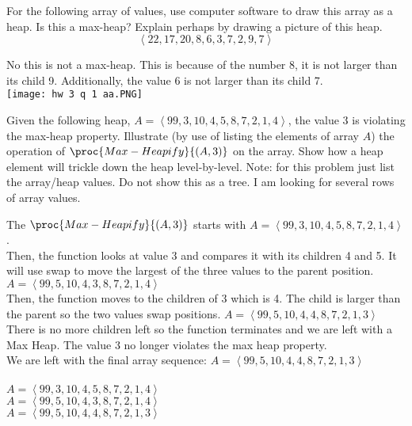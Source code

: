 \documentclass[addpoints,11pt]{exam}
\begin{document}
\begin{questions}


\question[5] For the following array of values, use computer software to draw this array as a heap.  Is this a max-heap?  Explain perhaps by drawing a picture of this heap.
$$\left< 22, 17, 20, 8, 6, 3, 7, 2, 9, 7\right>$$
\begin{solutionorbox}
	No this is not a max-heap. This is because of the number 8, it is not larger than its child 9. Additionally, the value 6 is not larger than its child 7.  \\ \texttt{[image: hw 3 q 1 aa.PNG]}
\end{solutionorbox}

\newpage


\question[10]
Given the following heap, $A = \left< 99, 3, 10, 4, 5, 8, 7, 2, 1, 4\right>$, the value 3 is violating the max-heap property.  Illustrate (by use of listing the elements of array $A$) the operation of $\proc{Max-Heapify}{(A,3)}$ on the array.  Show how a heap element will trickle down the heap level-by-level.  Note: for this problem just list the array/heap values.  Do not show this as a tree.  I am looking for several rows of array values.   
\begin{solutionorbox}
	The $\proc{Max-Heapify}{(A,3)}$ starts with $A = \left< 99, 3, 10, 4, 5, 8, 7, 2, 1, 4\right>$. 
 \\ Then, the function looks at value 3 and compares it with its children 4 and 5. It will use swap to move the largest of the three values to the parent position. $A = \left< 99, 5, 10, 4, 3, 8, 7, 2, 1, 4\right>$
 \\ Then, the function moves to the children of 3 which is 4. The child is larger than the parent so the two values swap positions. $A = \left< 99, 5, 10, 4, 4, 8, 7, 2, 1, 3\right>$
 \\ There is no more children left so the function terminates and we are left with a Max Heap. The value 3 no longer violates the max heap property. 
 \\ We are left with the final array sequence: $A = \left< 99, 5, 10, 4, 4, 8, 7, 2, 1, 3\right>$
 \\
 \\$A = \left< 99, 3, 10, 4, 5, 8, 7, 2, 1, 4\right>$
 \\$A = \left< 99, 5, 10, 4, 3, 8, 7, 2, 1, 4\right>$
 \\$A = \left< 99, 5, 10, 4, 4, 8, 7, 2, 1, 3\right>$
 

\end{solutionorbox}
\end{questions}
\end{document}

